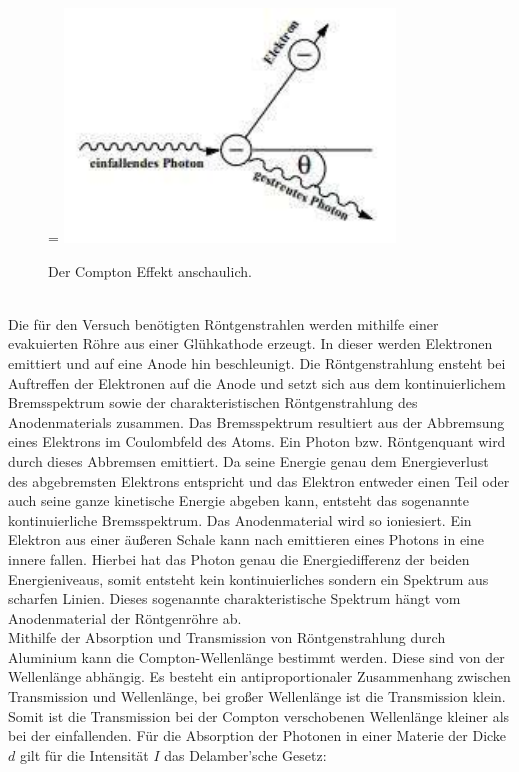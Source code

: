 \begin{figure}\label{fig:Compton_Effekt}
    \centering
    \width=\textwidth
    \includegraphics{bilder/compton_effekt.pdf}
    \caption{Der Compton Effekt anschaulich.}
\end{figure}
\\
\noindent
Die für den Versuch benötigten Röntgenstrahlen werden mithilfe einer evakuierten Röhre aus einer Glühkathode erzeugt.
In dieser werden  Elektronen emittiert und auf eine Anode hin beschleunigt.
Die Röntgenstrahlung ensteht bei Auftreffen der Elektronen auf die Anode und setzt sich aus dem kontinuierlichem Bremsspektrum sowie der charakteristischen Röntgenstrahlung des Anodenmaterials zusammen.
Das Bremsspektrum resultiert aus der Abbremsung eines Elektrons im Coulombfeld des Atoms.
Ein Photon bzw. Röntgenquant wird durch dieses Abbremsen emittiert.
Da seine Energie genau dem Energieverlust des abgebremsten Elektrons entspricht und das Elektron entweder einen Teil oder auch seine ganze kinetische Energie abgeben kann, entsteht das sogenannte kontinuierliche Bremsspektrum.
\noindent
Das Anodenmaterial wird so ioniesiert.
Ein Elektron aus einer äußeren Schale kann nach emittieren eines Photons in eine innere fallen.
Hierbei hat das Photon genau die Energiedifferenz der beiden Energieniveaus, somit entsteht kein kontinuierliches sondern ein Spektrum aus scharfen Linien.
Dieses sogenannte charakteristische Spektrum hängt vom Anodenmaterial der Röntgenröhre ab.
\\
\noindent
Mithilfe der Absorption und Transmission von Röntgenstrahlung durch Aluminium kann die Compton-Wellenlänge bestimmt werden.
Diese sind von der Wellenlänge abhängig.
Es besteht ein antiproportionaler Zusammenhang zwischen Transmission und Wellenlänge, bei großer Wellenlänge ist die Transmission klein.
Somit ist die Transmission bei der Compton verschobenen Wellenlänge kleiner als bei der einfallenden.
Für die Absorption der Photonen in einer Materie der Dicke $d$ gilt für die Intensität $I$ das Delamber'sche Gesetz:
